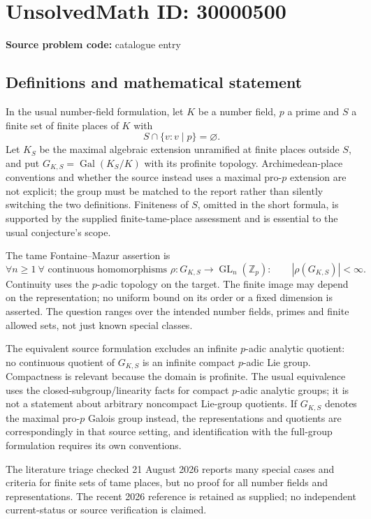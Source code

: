 \documentclass[11pt]{article}
\newcommand{\Z}{\mathbb{Z}}
\begin{document}
\section*{UnsolvedMath ID: 30000500}
\textbf{Source problem code:} catalogue entry
\subsection{Definitions and mathematical statement}
In the usual number-field formulation, let $K$ be a number field, $p$ a prime and $S$ a finite set of finite places of $K$ with
\[
 S\cap\{v:v\mid p\}=\varnothing.
\]
Let $K_S$ be the maximal algebraic extension unramified at finite places outside $S$, and put $G_{K,S}=\operatorname{Gal}(K_S/K)$ with its profinite topology. Archimedean-place conventions and whether the source instead uses a maximal pro-$p$ extension are not explicit; the group must be matched to the report rather than silently switching the two definitions. Finiteness of $S$, omitted in the short formula, is supported by the supplied finite-tame-place assessment and is essential to the usual conjecture's scope.

The tame Fontaine--Mazur assertion is
\[
 \forall n\geq1\ \forall\text{ continuous homomorphisms }
 \rho:G_{K,S}\to\operatorname{GL}_n(\Z_p):\qquad
 |\rho(G_{K,S})|<\infty.
\]
Continuity uses the $p$-adic topology on the target. The finite image may depend on the representation; no uniform bound on its order or a fixed dimension is asserted. The question ranges over the intended number fields, primes and finite allowed sets, not just known special classes.

The equivalent source formulation excludes an infinite $p$-adic analytic quotient: no continuous quotient of $G_{K,S}$ is an infinite compact $p$-adic Lie group. Compactness is relevant because the domain is profinite. The usual equivalence uses the closed-subgroup/linearity facts for compact $p$-adic analytic groups; it is not a statement about arbitrary noncompact Lie-group quotients. If $G_{K,S}$ denotes the maximal pro-$p$ Galois group instead, the representations and quotients are correspondingly in that source setting, and identification with the full-group formulation requires its own conventions.

The literature triage checked 21 August 2026 reports many special cases and criteria for finite sets of tame places, but no proof for all number fields and representations. The recent 2026 reference is retained as supplied; no independent current-status or source verification is claimed.
\end{document}
